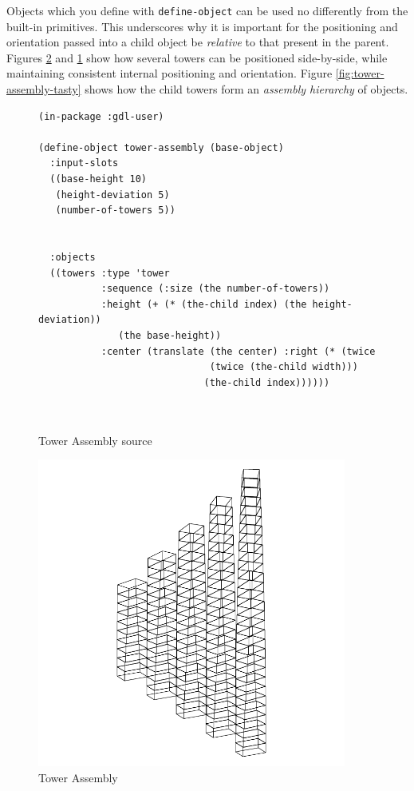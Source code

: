 \documentclass [11pt]{book}
\begin{document}
Objects which you define with \texttt{define-object} can be used no differently from the built-in primitives. This
underscores why it is important for the positioning and orientation
passed into a child object be \emph{relative} to that present in the parent. Figures 
\ref{fig:tower-assembly} and 
\ref{fig:tower-assembly-source} show how several towers can be positioned side-by-side, while
maintaining consistent internal positioning and orientation. Figure 
\ref{fig:tower-assembly-tasty} shows how the child towers form an \emph{assembly hierarchy} of objects.\begin{figure}\begin{lrbox}{\boxedverb}
\begin{minipage}{\linewidth}\begin{verbatim}(in-package :gdl-user)

(define-object tower-assembly (base-object)
  :input-slots 
  ((base-height 10)
   (height-deviation 5)
   (number-of-towers 5))
  
  
  :objects
  ((towers :type 'tower
           :sequence (:size (the number-of-towers))
           :height (+ (* (the-child index) (the height-deviation))
		      (the base-height))
           :center (translate (the center) :right (* (twice
						      (twice (the-child width)))
						     (the-child index))))))

 

\end{verbatim}\end{minipage}
\end{lrbox}
\fbox{\usebox{\boxedverb}}

\caption{Tower Assembly source}

\label{fig:tower-assembly-source}

\end{figure}

\begin{figure}
\begin{center}
\includegraphics[width=4in,height=4in]{../images/tower-assembly.pdf}
\end{center}

\caption{Tower Assembly}

\label{fig:tower-assembly}

\end{figure}
\end{document}
